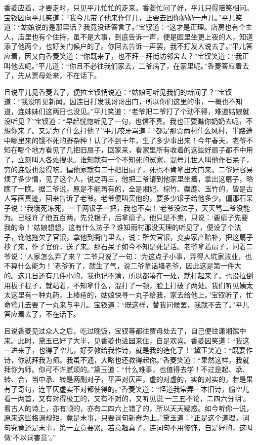 \documentclass[12pt,oneside]{book}
\begin{document}
香菱应着，才要走时，只见平儿忙忙的走来。香菱忙问了好，平儿只得陪笑相问。宝钗因向平儿笑道：“我今儿带了他来作伴儿，正要去回你奶奶一声儿。”平儿笑道：“姑娘说的是那里话？我竟没话答言了。”宝钗道：“这才是正理。店房也有个主人，庙里也有个住持，虽不是大事，到底告诉一声，便是园里坐更上夜的人，知道添了他两个，也好关门候户的了。你回去告诉一声罢，我不打发人说去了。”平儿答应着，因又向香菱笑道：“你既来了，也不拜一拜街坊邻舍去？”宝钗笑道：“我正叫他去呢。”平儿道：“你且不必往我们家去，二爷病了，在家里呢。”香菱答应着去了，先从贾母处来，不在话下。

且说平儿见香菱去了，便拉宝钗悄说道：“姑娘可听见我们的新闻了？”宝钗道：“我没听见新闻。因连日打发我哥哥出门，所以你们这里的事，一概也不知道，连姊妹们这两日也没见。”平儿笑道：“老爷把二爷打了个动不得，难道姑娘就没听见？”宝钗道：“早起恍惚听见了一句，也信不真。我也正要瞧你奶奶去呢，不想你来了。又是为了什么打他？”平儿咬牙骂道：“都是那贾雨村什么风村，半路途中哪里来的饿不死的野杂种！认了不到十年，生了多少事出来！今年春天，老爷不知在哪个地方看见了几把旧扇子，回家来，看家里所有收着的这些好扇子都不中用了，立刻叫人各处搜求。谁知就有一个不知死的冤家，混号儿世人叫他作石呆子，穷的连饭也没得吃，偏他家就有二十把旧扇子，死也不肯拿出大门来。二爷好容易烦了多少情，见了这个人，说之再三，他把二爷请到他家里坐着，拿出这扇子，略瞧了一瞧。据二爷说，原是不能再有的，全是湘妃、棕竹、麋鹿、玉竹的，皆是古人写画真迹，回来告诉了老爷。老爷便叫买他的，要多少银子给他多少。偏那石呆子说：‘我饿死冻死，一千两银子一把，我也不卖！’老爷没法子，天天骂二爷没能为。已经许了他五百两，先兑银子，后拿扇子。他只是不卖，只说：‘要扇子先要我的命！’姑娘想想，这有什么法子？谁知雨村那没天理的听见了，便设了个法子，讹他拖欠了官银，拿他到衙门里去，说：所欠官银，变卖家产赔补，把这扇子抄了来，作了官价，送了来。那石呆子如今不知是死是活。老爷拿着扇子，问着二爷说：‘人家怎么弄了来？’二爷只说了一句：‘为这点子小事，弄得人坑家败业，也不算什么能为！’老爷听了，就生了气，说二爷拿话堵老爷，因此这是第一件大的。这几日还有几件小的，我也记不清，所以都凑在一处，就打起来了。也没拉倒用板子棍子，就站着，不知拿什么，混打了一顿，脸上打破了两处。我们听见姨太太这里有一种丸药，上棒疮的，姑娘快寻一丸子给我，家去给他上。”宝钗听了，忙命莺儿去要了一丸来与平儿。宝钗道：“既这样，替我问候罢，我就不去了。”平儿答应着去了，不在话下。

且说香菱见过众人之后，吃过晚饭，宝钗等都往贾母处去了，自己便往潇湘馆中来。此时，黛玉已好了大半，见香菱也进园来住，自是欢喜。香菱因笑道：“我这一进来了，也得了空儿，好歹教给我作诗，就是我的造化了！”黛玉笑道：“既要作诗，你就拜我为师。我虽不通，大略也还教得起你。”香菱笑道：“果然这样，我就拜你为师。你可不许腻烦的。”黛玉道：“什么难事，也值得去学！不过是起、承、转、合，当中承、转是两副对子，平声对仄声，虚的对虚的，实的对实的，若是果有了奇句，连平仄虚实不对都使得的。”香菱笑道：“怪道我常弄一本旧诗，偷空儿看一两首，又有对得极工的，又有不对的，又听见说‘一三五不论，二四六分明’。看古人的诗上，亦有顺的，亦有二四六上错了的，所以天天疑惑。如今听你一说，原来这些格调规矩，竟是末事，只要词句新奇为上。”黛玉道：“正是这个道理，词句究竟还是末事，第一立意要紧。若意趣真了，连词句不用修饰，自是好的，这叫做‘不以词害意’。”
\end{document}
